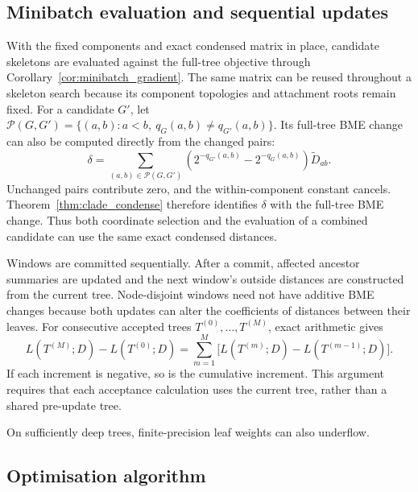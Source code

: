 \documentclass[11pt,a4paper]{article}
\makeatletter
\DeclareRobustCommand{\_}{\ifmmode\nfss@text{\textunderscore}\else\textunderscore\allowbreak\fi}
\theoremstyle{definition}
\makeatother
\begin{document}
\subsection{Minibatch evaluation and sequential updates}
\label{sec:acceptance}

With the fixed components and exact condensed matrix in place, candidate skeletons are evaluated against the full-tree objective through Corollary~\ref{cor:minibatch_gradient}.
The same matrix can be reused throughout a skeleton search because its component topologies and attachment roots remain fixed.
For a candidate $G'$, let $\mathcal P(G,G')=\{(a,b):a<b,\ q_G(a,b)\ne q_{G'}(a,b)\}$.
Its full-tree BME change can also be computed directly from the changed pairs:
\begin{equation}
 \delta=\sum_{(a,b)\in\mathcal P(G,G')}
   \left(2^{-q_{G'}(a,b)}-2^{-q_G(a,b)}\right)
   \widetilde D_{ab}.
 \label{eq:changed_pairs}
\end{equation}
Unchanged pairs contribute zero, and the within-component constant cancels.
Theorem~\ref{thm:clade_condense} therefore identifies $\delta$ with the full-tree BME change.
Thus both coordinate selection and the evaluation of a combined candidate can use the same exact condensed distances.

Windows are committed sequentially.
After a commit, affected ancestor summaries are updated and the next window's outside distances are constructed from the current tree.
Node-disjoint windows need not have additive BME changes because both updates can alter the coefficients of distances between their leaves.
For consecutive accepted trees $T^{(0)},\ldots,T^{(M)}$, exact arithmetic gives
\begin{equation}
 L(T^{(M)};D)-L(T^{(0)};D)
 =\sum_{m=1}^M\bigl[L(T^{(m)};D)-L(T^{(m-1)};D)\bigr].
 \label{eq:telescoping}
\end{equation}
If each increment is negative, so is the cumulative increment.
This argument requires that each acceptance calculation uses the current tree, rather than a shared pre-update tree.

On sufficiently deep trees, finite-precision leaf weights can also underflow.

\subsection{Optimisation algorithm}
\label{sec:optimizer}
\end{document}
